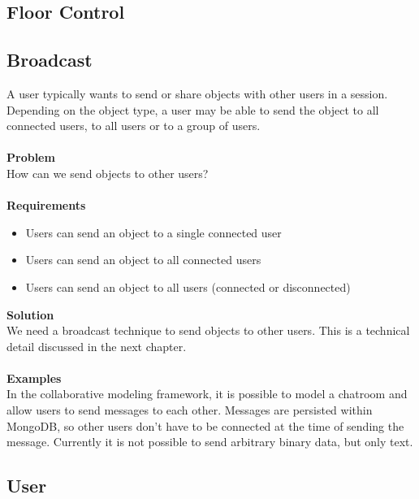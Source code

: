 \subsection{Floor Control}

\subsection{Broadcast}

A user typically wants to send or share objects with other users in a session. Depending on the object type, a user may be able to send the object to all connected users, to all users or to a group of users.
\\ \\
\textbf{Problem}
\\
How can we send objects to other users?
\\ \\
\textbf{Requirements}
\begin{itemize}
\item{Users can send an object to a single connected user}
\item{Users can send an object to all connected users}
\item{Users can send an object to all users (connected or disconnected)}
\end{itemize}
\textbf{Solution}
\\
We need a broadcast technique to send objects to other users. This is a technical detail discussed in the next chapter.
\\ \\
\textbf{Examples}
\\
In the collaborative modeling framework, it is possible to model a chatroom and allow users to send messages to each other. Messages are persisted within MongoDB, so other users don't have to be connected at the time of sending the message. Currently it is not possible to send arbitrary binary data, but only text.

\subsection{User}

